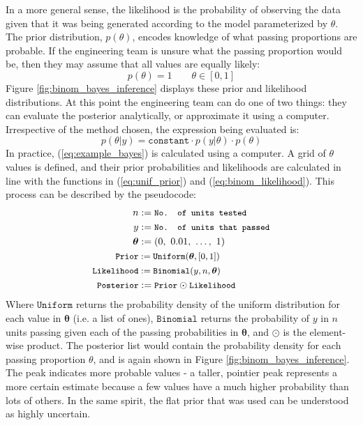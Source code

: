 \documentclass[11pt,a4paper,article]{memoir} %
\begin{document}
In a more general sense, the likelihood is the probability of observing the data given that it was being generated according to the model parameterized by $\theta$.
The prior distribution, $p(\theta)$, encodes knowledge of what passing proportions are probable. If the engineering team is unsure what the passing proportion would be, then they may assume that all values are equally likely:
\begin{equation}
  p(\theta) = 1 \qquad \theta \in [0, 1]
  \label{eq:unif_prior}
\end{equation}
Figure \ref{fig:binom_bayes_inference} displays these prior and likelihood distributions. At this point the engineering team can do one of two things: they can evaluate the posterior analytically, or approximate it using a computer. Irrespective of the method chosen, the expression being evaluated is:
\begin{equation}
	p(\theta|y) = \texttt{constant}\cdot p(y|\theta) \cdot p(\theta)
	\label{eq:example_bayes}
\end{equation}
In practice, (\ref{eq:example_bayes}) is calculated using a computer. A grid of $\theta$ values is defined, and their prior probabilities and likelihoods are calculated in line with the functions in (\ref{eq:unif_prior}) and (\ref{eq:binom_likelihood}). This process can be described by the pseudocode:
\begin{align*}
  \quad n &:= \small{\texttt{No. of units tested}} \\
   \quad y &:= \small{\texttt{No. of units that passed}} \\
  \boldsymbol{\theta} & := (0, \ 0.01, \ \dots, \ 1) \\
  \small{\texttt{Prior}} &:= \small{\texttt{Uniform}}(\boldsymbol{\theta}, [0, 1]) \\
  \small{\texttt{Likelihood}} &:= \small{\texttt{Binomial}}(y, n, \boldsymbol{\theta}) \\ 
  \small{\texttt{Posterior}} &:= \small{\texttt{Prior} \odot \texttt{Likelihood}}
\end{align*}
Where $\texttt{Uniform}$ returns the probability density of the uniform distribution for each value in $\boldsymbol{\theta}$ (i.e. a list of ones), $\texttt{Binomial}$ returns the probability of $y$ in $n$ units passing given each of the passing probabilities in $\boldsymbol{\theta}$, and $\odot$ is the element-wise product.
The posterior list would contain the probability density for each passing proportion $\theta$, and is again shown in Figure \ref{fig:binom_bayes_inference}. The peak indicates more probable values - a taller, pointier peak represents a more certain estimate because a few values have a much higher probability than lots of others. In the same spirit, the flat prior that was used can be understood as highly uncertain.
\end{document}
